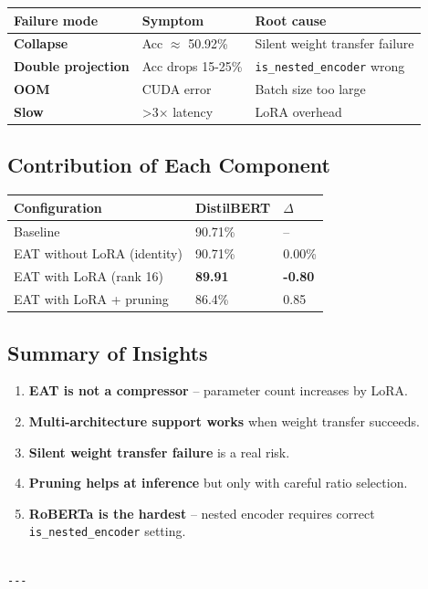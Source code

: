 \begin{table}[H]
\centering
\small
\begin{tabular}{lll}
\toprule
\textbf{Failure mode} & \textbf{Symptom} & \textbf{Root cause} \\
\midrule
\textbf{Collapse} & Acc $\approx$ 50.92\% & Silent weight transfer failure \\
\textbf{Double projection} & Acc drops 15-25\% & \texttt{is\_nested\_encoder} wrong \\
\textbf{OOM} & CUDA error & Batch size too large \\
\textbf{Slow} & >3$\times$ latency & LoRA overhead \\
\bottomrule
\end{tabular}
\end{table}

\subsection{Contribution of Each Component}

\begin{table}[H]
\centering
\small
\begin{tabular}{lll}
\toprule
\textbf{Configuration} & \textbf{DistilBERT} & \textbf{$\Delta$} \\
\midrule
Baseline & 90.71\% & -- \\
EAT without LoRA (identity) & 90.71\% & 0.00\% \\
EAT with LoRA (rank 16) & \textbf{89.91} & \textbf{-0.80} \\
EAT with LoRA + pruning & 86.4\% & 0.85 \\
\bottomrule
\end{tabular}
\end{table}

\subsection{Summary of Insights}

\begin{enumerate}
\item \textbf{EAT is not a compressor} -- parameter count increases by LoRA.
\item \textbf{Multi-architecture support works} when weight transfer succeeds.
\item \textbf{Silent weight transfer failure} is a real risk.
\item \textbf{Pruning helps at inference} but only with careful ratio selection.
\item \textbf{RoBERTa is the hardest} -- nested encoder requires correct
  \texttt{is\_nested\_encoder} setting.
\end{enumerate}
\begin{lstlisting}

---
\end{lstlisting}


